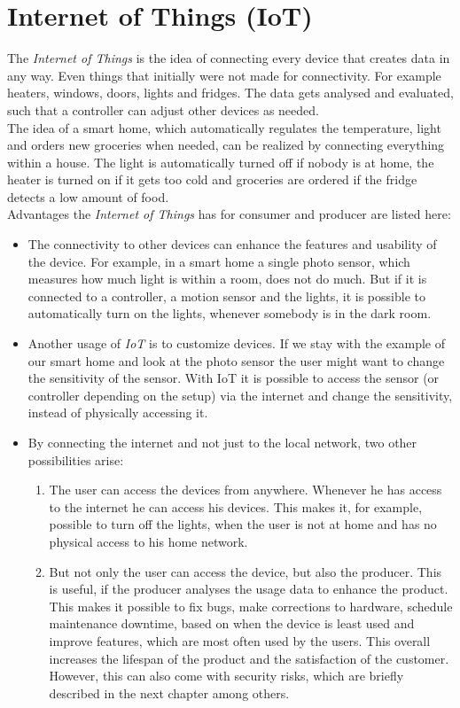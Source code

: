 \chapter{Internet of Things (IoT)}

The \textit{Internet of Things} is the idea of connecting every device that creates data in any way. Even things that initially were not made for connectivity. For example heaters, windows, doors, lights and fridges. The data gets analysed and evaluated, such that a controller can adjust other devices as needed. \\
The idea of a smart home, which automatically regulates the temperature, light and orders new groceries when needed, can be realized by connecting everything within a house. The light is automatically turned off if nobody is at home, the heater is turned on if it gets too cold and groceries are ordered if the fridge detects a low amount of food.  \\
Advantages the \textit{Internet of Things} has for consumer and producer are listed here:
\begin{itemize}
	 \item The connectivity to other devices can enhance the features and usability of the device. For example, in a smart home a single photo sensor, which measures how much light is within a room, does not do much. But if it is connected to a controller, a motion sensor and the lights, it is possible to automatically turn on the lights, whenever somebody is in the dark room. 
	 \item Another usage of \textit{IoT} is to customize devices. If we stay with the example of our smart home and look at the photo sensor the user might want to change the sensitivity of the sensor. With IoT it is possible to access the sensor (or controller depending on the setup) via the internet and change the sensitivity, instead of physically accessing it.
	 \item By connecting the internet and not just to the local network, two other possibilities arise:
	 \begin{enumerate}
	 	\item The user can access the devices from anywhere. Whenever he has access to the internet he can access his devices. This makes it, for example, possible to turn off the lights, when the user is not at home and has no physical access to his home network. 
	 	\item But not only the user can access the device, but also the producer. This is useful, if the producer analyses the usage data to enhance the product. This makes it possible to fix bugs, make corrections to hardware, schedule maintenance downtime, based on when the device is least used and improve features, which are most often used by the users. This overall increases the lifespan of the product and the satisfaction of the customer. \\
	 	However, this can also come with security risks, which are briefly described in the next chapter among others.  
	 \end{enumerate}
\end{itemize}


